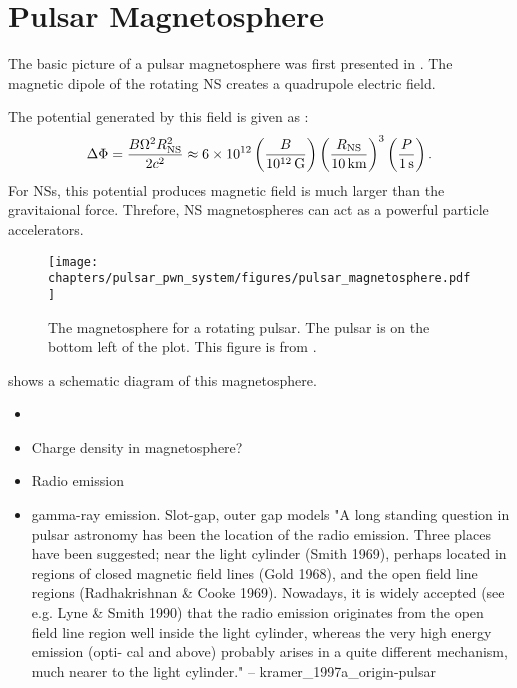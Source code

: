 \section{Pulsar Magnetosphere}

The basic picture of a pulsar magnetosphere was first presented in
\cite{goldreich_1969_pulsar-electrodynamics}.  The magnetic dipole
of the rotating \ac{NS} creates a quadrupole electric field.

The potential generated
by this field is given as \citep{goldreich_1969_pulsar-electrodynamics}:
\begin{equation}
\Delta \Phi = \frac{B \Omega^2 R_\text{NS}^2}{2c^2}
\approx 6\times 10^{12} 
\left(\frac{B}{10^{12}\,\text{G}}\right)
\left(\frac{R_\text{NS}}{10\,\text{km}}\right)^3
\left(\frac{P}{1\,\text{s}}\right).
\end{equation}
For \acp{NS}, this potential produces magnetic field is much larger than
the gravitaional force. Threfore, \ac{NS} magnetospheres can act as a
powerful particle accelerators.



\begin{figure}[htbp]
  \centering
    \texttt{[image: chapters/pulsar\_pwn\_system/figures/pulsar\_magnetosphere.pdf]}
  \caption{The magnetosphere for a rotating pulsar.
  The pulsar is on the bottom left of the plot. This figure is
  from \cite{goldreich_1969_pulsar-electrodynamics}.}
\end{figure}

 shows a schematic diagram of this
magnetosphere.

\begin{itemize}
  \item
\item Charge density in magnetosphere?
  \item Radio emission
  \item gamma-ray emission. Slot-gap, outer gap models
"A long standing question in pulsar astronomy has been the location
of the radio emission. Three places have been suggested; near the light
cylinder (Smith 1969), perhaps located in regions of closed magnetic
field lines (Gold 1968), and the open field line regions (Radhakrishnan
\& Cooke 1969). Nowadays, it is widely accepted (see e.g. Lyne \& Smith
1990) that the radio emission originates from the open field line region
well inside the light cylinder, whereas the very high energy emission
(opti- cal and above) probably arises in a quite different mechanism,
much nearer to the light cylinder." -- kramer\_1997a\_origin-pulsar
\end{itemize}


